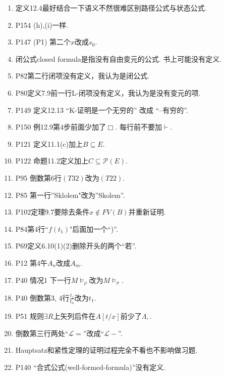 \documentclass{article}
\begin{document}
\begin{enumerate}
\item 定义12.4最好结合一下语义不然很难区别路径公式与状态公式. 
\item P154 (h),(i)一样. 
\item P147 (P1) 第二个$x$改成$s_0$. 
\item 闭公式closed formula是指没有自由变元的公式. 书上可能没有定义. 
\item P82第二行闭项没有定义，我认为是闭公式. 
\item P80定义7.9前一行L-闭项没有定义，我认为是没有变元的项. 
\item P149 定义12.13 ``K-证明是一个无穷的'' 改成 ``--有穷的''. 
\item P150 例12.9第4步前面少加了$\Box$. 每行前不要加$\vdash$. 
\item P121 定义11.1(c)加上$B\subseteq E$. 
\item P122 命题11.2定义加上$C\subseteq \mathcal{P}(E)$. 
\item P95 倒数第6行$(T32)$改为$(T22)$. 
\item P85 第一行''Sklolem"改为''Skolem''. 
\item P102定理9.7要除去条件$x\notin FV(B)$并重新证明. 
\item P84第4行``$f(t_1)$"后面加一个``)''. 
\item P69定义6.10(1)(2)删除开头的两个``若''. 
\item P12 第4午$A_n$改成$A_m$. 
\item P40 情况1 下一行$M\models_\rho$改为$M\models_\sigma$. 
\item P40 倒数第3, 4行$\frac{t_1}{t_n}$改为$t_1$. 
\item P51 规则$\exists R$上矢列后件在$A[t/x]$前少了$\Lambda, $. 
\item 倒数第三行两处``$\mathscr{L}=$''改成``$\mathscr{L}-$''. 
\item Hauptsatz和紧性定理的证明过程完全不看也不影响做习题. 
\item P140 ``合式公式(well-formed-formula)''没有定义. 
\end{enumerate}
\end{document}
